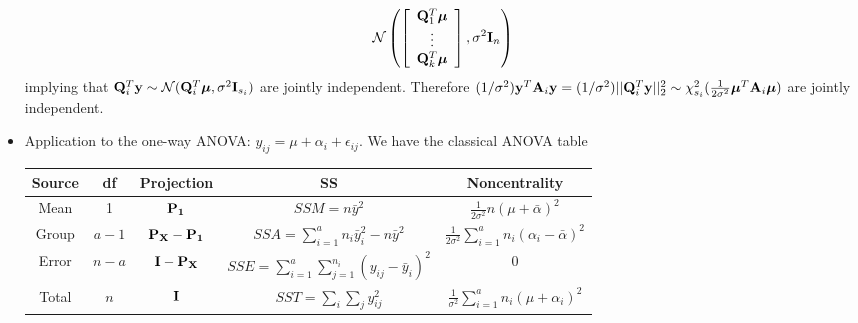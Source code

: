 \begin{itemize}
\begin{pf}
$$    	\mathcal{N}\left( \left[\begin{array}{c}
    		\mathbf{Q}_1^T \boldsymbol{\mu}\\
    		\vdots\\
    		\mathbf{Q}_k^T \boldsymbol{\mu}\\
    	\end{array}\right], \sigma^2 \mathbf{I}_n \right)
    	$$
    	implying that $\mathbf{Q}_i^T\mathbf{y} \sim \mathcal{N}(\mathbf{Q}_i^T \boldsymbol{\mu}, \sigma^2 \mathbf{I}_{s_i} )$ are jointly independent. Therefore $(1/\sigma^2) \mathbf{y}^T\mathbf{A}_i \mathbf{y} = (1 / \sigma^2)||\mathbf{Q}_i^T \mathbf{y}||_2^2 \sim \chi_{s_i}^2(\frac{1}{2\sigma^2}\boldsymbol{\mu}^T\mathbf{A}_i \boldsymbol{\mu})$ are jointly independent.
    \end{pf}
	\item Application to the one-way ANOVA: $y_{ij} = \mu + \alpha_i + \epsilon_{ij}$.  We have  the classical ANOVA table
	\begin{table}[H]
		\renewcommand{\arraystretch}{1.5}
		\centering
		\begin{tabular}{ccccc}
			\toprule
			Source & df & Projection & SS & Noncentrality\\
			\hline
			Mean & 1 & $\mathbf{P}_{\mathbf{1}}$ & $SSM = n \bar{y}^2$ & $\frac{1}{2\sigma^2}n (\mu + \bar{\alpha})^2$\\
			Group & $a - 1$ & $\mathbf{P}_{\mathbf{X}} - \mathbf{P}_{\mathbf{1}}$ & $SSA = \sum_{i = 1}^{a} n_i \bar{y}_i^2 - n \bar{y}^2$ & $\frac{1}{2\sigma^2} \sum_{i = 1}^a n_i (\alpha_i - \bar{\alpha})^2$ \\
			Error & $n - a$ & $\mathbf{I} - \mathbf{P}_{\mathbf{X}}$ & $SSE = \sum_{i = 1}^{a}\sum_{j = 1}^{n_i} (y_{ij} - \bar{y}_i)^2$ & 0\\
			\hline
			Total & $n$ & $\mathbf{I}$ & $SST = \sum_i \sum_j y_{ij}^2$ & $\frac{1}{\sigma^2} \sum_{i=1}^{a} n_i (\mu + \alpha_i)^2$\\
			\bottomrule
		\end{tabular}
	\end{table}
\end{itemize}





















